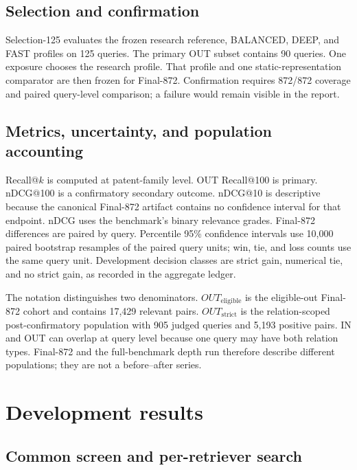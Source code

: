 \documentclass[final,5p,times,twocolumn]{elsarticle}
\begin{document}
\subsection{Selection and confirmation}

Selection-125 evaluates the frozen research reference, BALANCED, DEEP, and FAST profiles
on 125 queries. The primary OUT subset contains 90 queries. One exposure
chooses the research profile. That profile and one static-representation
comparator are then frozen for Final-872. Confirmation requires 872/872 coverage and
paired query-level comparison; a failure would remain visible in the report.

\subsection{Metrics, uncertainty, and population accounting}

Recall@\(k\) is computed at patent-family level. OUT Recall@100 is primary.
nDCG@100 is a confirmatory secondary outcome. nDCG@10 is descriptive because
the canonical Final-872 artifact contains no confidence interval for that
endpoint. nDCG uses the benchmark's binary relevance grades. Final-872
differences are paired by query. Percentile 95\% confidence intervals use
10,000 paired bootstrap resamples of the paired query units; win, tie, and
loss counts use the same query unit. Development decision classes are strict
gain, numerical tie, and no strict gain, as recorded in the aggregate ledger.

The notation distinguishes two denominators. \(OUT_{\mathrm{eligible}}\) is
the eligible-out Final-872 cohort and contains 17,429 relevant pairs.
\(OUT_{\mathrm{strict}}\) is the relation-scoped post-confirmatory population
with 905 judged queries and 5,193 positive pairs. IN and OUT can overlap at
query level because one query may have both relation types. Final-872 and the
full-benchmark depth run therefore describe different populations; they are
not a before--after series.

\section{Development results}\label{sec:development}

\subsection{Common screen and per-retriever search}
\end{document}
